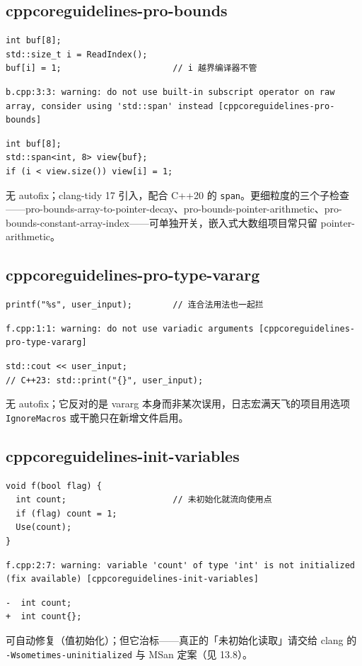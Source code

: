 \documentclass[12pt,a4paper,fontset=fandol]{ctexbook}
\newcommand{\cpp}[1]{C++#1}
\newcommand{\Tp}[1]{\texttt{#1}}
\begin{document}
\subsection{cppcoreguidelines-pro-bounds}\label{sec:ch13-s5a}
\begin{lstlisting}[style=cppstyle]
int buf[8];
std::size_t i = ReadIndex();
buf[i] = 1;                      // i 越界编译器不管
\end{lstlisting}
\begin{lstlisting}[style=shellstyle]
b.cpp:3:3: warning: do not use built-in subscript operator on raw array, consider using 'std::span' instead [cppcoreguidelines-pro-bounds]
\end{lstlisting}
\begin{lstlisting}[style=cppstyle]
int buf[8];
std::span<int, 8> view{buf};
if (i < view.size()) view[i] = 1;
\end{lstlisting}
无 autofix；clang-tidy 17 引入，配合 \cpp{20} 的 \Tp{span}。更细粒度的三个子检查——pro-bounds-array-to-pointer-decay、pro-bounds-pointer-arithmetic、pro-bounds-constant-array-index——可单独开关，嵌入式大数组项目常只留 pointer-arithmetic。
\subsection{cppcoreguidelines-pro-type-vararg}\label{sec:ch13-s5b}
\begin{lstlisting}[style=cppstyle]
printf("%s", user_input);        // 连合法用法也一起拦
\end{lstlisting}
\begin{lstlisting}[style=shellstyle]
f.cpp:1:1: warning: do not use variadic arguments [cppcoreguidelines-pro-type-vararg]
\end{lstlisting}
\begin{lstlisting}[style=cppstyle]
std::cout << user_input;
// C++23: std::print("{}", user_input);
\end{lstlisting}
无 autofix；它反对的是 vararg 本身而非某次误用，日志宏满天飞的项目用选项 \texttt{IgnoreMacros} 或干脆只在新增文件启用。
\subsection{cppcoreguidelines-init-variables}\label{sec:ch13-s5c}
\begin{lstlisting}[style=cppstyle]
void f(bool flag) {
  int count;                     // 未初始化就流向使用点
  if (flag) count = 1;
  Use(count);
}
\end{lstlisting}
\begin{lstlisting}[style=shellstyle]
f.cpp:2:7: warning: variable 'count' of type 'int' is not initialized (fix available) [cppcoreguidelines-init-variables]
\end{lstlisting}
\begin{lstlisting}[style=diffstyle]
-  int count;
+  int count{};
\end{lstlisting}
可自动修复（值初始化）；但它治标——真正的「未初始化读取」请交给 clang 的 \texttt{-Wsometimes-uninitialized} 与 MSan 定案（见 13.8）。
\end{document}
